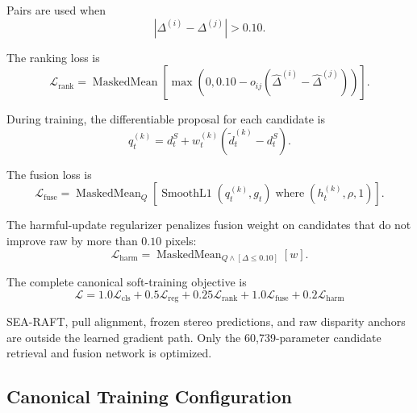 \documentclass[11pt,a4paper]{article}
\begin{document}
Pairs are used when
%
\begin{equation}
\left|
\Delta^{(i)}-\Delta^{(j)}
\right|
>
0.10.
\end{equation}

The ranking loss is
%
\begin{equation}
\mathcal{L}_{\mathrm{rank}}
=
\operatorname{MaskedMean}
\left[
\max
\left(
0,
0.10-
o_{ij}
\left(
\widehat{\Delta}^{(i)}
-
\widehat{\Delta}^{(j)}
\right)
\right)
\right].
\label{eq:ranking_loss}
\end{equation}

During training, the differentiable proposal for each candidate is
%
\begin{equation}
q_t^{(k)}
=
d_t^S
+
w_t^{(k)}
\left(
\widetilde d_t^{(k)}-d_t^S
\right).
\end{equation}

The fusion loss is
%
\begin{equation}
\mathcal{L}_{\mathrm{fuse}}
=
\operatorname{MaskedMean}_{Q}
\left[
\operatorname{SmoothL1}
\left(
q_t^{(k)},
g_t
\right)
\operatorname{where}
\left(
h_t^{(k)},
\rho,
1
\right)
\right].
\label{eq:fusion_loss}
\end{equation}

The harmful-update regularizer penalizes fusion weight on candidates that
do not improve raw by more than \(0.10\) pixels:
%
\begin{equation}
\mathcal{L}_{\mathrm{harm}}
=
\operatorname{MaskedMean}_{
Q\land[\Delta\leq0.10]
}
\left[
w
\right].
\label{eq:harm_regularizer}
\end{equation}

The complete canonical soft-training objective is
%
\begin{equation}
\boxed{
\mathcal{L}
=
1.0\mathcal{L}_{\mathrm{cls}}
+
0.5\mathcal{L}_{\mathrm{reg}}
+
0.25\mathcal{L}_{\mathrm{rank}}
+
1.0\mathcal{L}_{\mathrm{fuse}}
+
0.2\mathcal{L}_{\mathrm{harm}}
}
\label{eq:complete_training_loss}
\end{equation}

SEA-RAFT, pull alignment, frozen stereo predictions, and raw disparity
anchors are outside the learned gradient path. Only the 60,739-parameter
candidate retrieval and fusion network is optimized.

\subsection{Canonical Training Configuration}
\label{sec:training_configuration}
\end{document}

